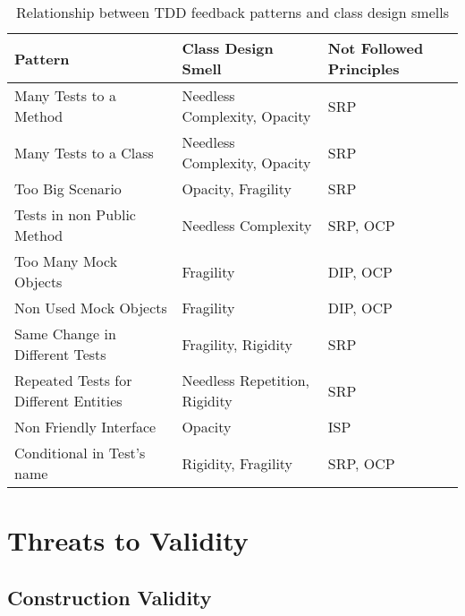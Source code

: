 \documentclass[times]{speauth}
\begin{document}
\begin{table}[h!]
	\centering
	\begin{tabular}{| p{4.5cm} | p{4.5cm} | p{3cm} | }
		\hline

		\textbf{Pattern} & \textbf{Class Design Smell} & \textbf{Not Followed Principles}\\
		
		\hline

		Many Tests to a Method                   & Needless Complexity, Opacity   & SRP \\ \hline
		Many Tests to a Class                  & Needless Complexity, Opacity   & SRP \\ \hline
		Too Big Scenario                           & Opacity, Fragility                  & SRP \\ \hline
		Tests in non Public Method             & Needless Complexity              & SRP, OCP \\ \hline
		Too Many Mock Objects                       & Fragility                             & DIP, OCP \\ \hline
		Non Used Mock Objects                  & Fragility                             & DIP, OCP \\ \hline
		Same Change in Different Tests           & Fragility, Rigidity                    & SRP \\ \hline
		Repeated Tests for Different Entities     & Needless Repetition, Rigidity        & SRP  \\ \hline
		Non Friendly Interface                         & Opacity                               & ISP \\ \hline
		Conditional in Test's name                   & Rigidity, Fragility                    & SRP, OCP \\

		\hline
		
	\end{tabular}
	\caption{Relationship between TDD feedback patterns and class design smells}
	\label{tab:relacao-padroes}
\end{table}

\section{Threats to Validity}
\label{cap:ameacas}

\subsection{Construction Validity}
\end{document}
